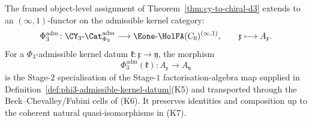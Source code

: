 \begin{theorem}
\label{thm:phi3-witnessed-kernel-functoriality}
The framed object-level assignment of Theorem~\ref{thm:cy-to-chiral-d3}
extends to an $(\infty,1)$-functor on the admissible kernel category:
\[
 \Phi_3^{\mathrm{adm}}\colon
 \CY_3\text{-}\Cat_{\Phi_3}^{\mathrm{adm}}
 \longrightarrow
 \Eone\text{-}\HolFA(C_0)^{(\infty,1)},\qquad
 \mathfrak x\longmapsto A_{\mathfrak x}.
\]
For a $\Phi_3$-admissible kernel datum
$\mathfrak k\colon\mathfrak x\to\mathfrak y$, the morphism
\[
 \Phi_3^{\mathrm{adm}}(\mathfrak k)
 \colon A_{\mathfrak x}\longrightarrow A_{\mathfrak y}
\]
is the Stage-$2$ specialisation of the Stage-$1$ factorisation-algebra
map supplied in Definition~\ref{def:phi3-admissible-kernel-datum}\textup{(K5)}
and transported through the Beck--Chevalley/Fubini cells of
\textup{(K6)}. It preserves identities and composition up to the
coherent natural quasi-isomorphisms in \textup{(K7)}.
\end{theorem}

